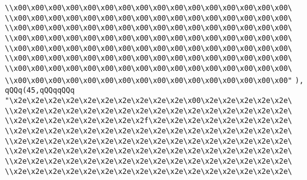\verb|\\x00\x00\x00\x00\x00\x00\x00\x00\x00\x00\x00\x00\x00\x00\x00\x00\|\newline
\verb|\\x00\x00\x00\x00\x00\x00\x00\x00\x00\x00\x00\x00\x00\x00\x00\x00\|\newline
\verb|\\x00\x00\x00\x00\x00\x00\x00\x00\x00\x00\x00\x00\x00\x00\x00\x00\|\newline
\verb|\\x00\x00\x00\x00\x00\x00\x00\x00\x00\x00\x00\x00\x00\x00\x00\x00\|\newline
\verb|\\x00\x00\x00\x00\x00\x00\x00\x00\x00\x00\x00\x00\x00\x00\x00\x00\|\newline
\verb|\\x00\x00\x00\x00\x00\x00\x00\x00\x00\x00\x00\x00\x00\x00\x00\x00\|\newline
\verb|\\x00\x00\x00\x00\x00\x00\x00\x00\x00\x00\x00\x00\x00\x00\x00\x00\|\newline
\verb|\\x00\x00\x00\x00\x00\x00\x00\x00\x00\x00\x00\x00\x00\x00\x00\x00"|\newline
\verb|),|\newline
\verb|qQQq(45,qQQqqQQq|\newline
\verb|"\x2e\x2e\x2e\x2e\x2e\x2e\x2e\x2e\x2e\x2e\x00\x2e\x2e\x2e\x2e\x2e\|\newline
\verb|\\x2e\x2e\x2e\x2e\x2e\x2e\x2e\x2e\x2e\x2e\x2e\x2e\x2e\x2e\x2e\x2e\|\newline
\verb|\\x2e\x2e\x2e\x2e\x2e\x2e\x2e\x2f\x2e\x2e\x2e\x2e\x2e\x2e\x2e\x2e\|\newline
\verb|\\x2e\x2e\x2e\x2e\x2e\x2e\x2e\x2e\x2e\x2e\x2e\x2e\x2e\x2e\x2e\x2e\|\newline
\verb|\\x2e\x2e\x2e\x2e\x2e\x2e\x2e\x2e\x2e\x2e\x2e\x2e\x2e\x2e\x2e\x2e\|\newline
\verb|\\x2e\x2e\x2e\x2e\x2e\x2e\x2e\x2e\x2e\x2e\x2e\x2e\x2e\x2e\x2e\x2e\|\newline
\verb|\\x2e\x2e\x2e\x2e\x2e\x2e\x2e\x2e\x2e\x2e\x2e\x2e\x2e\x2e\x2e\x2e\|\newline
\verb|\\x2e\x2e\x2e\x2e\x2e\x2e\x2e\x2e\x2e\x2e\x2e\x2e\x2e\x2e\x2e\x2e\|\newline
